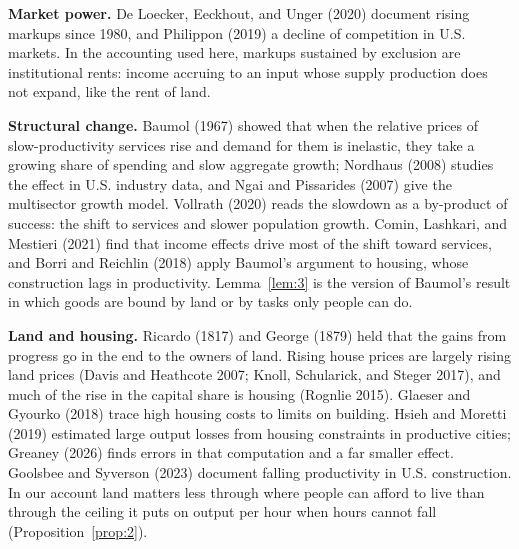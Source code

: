 \documentclass[12pt]{article}
\theoremstyle{plain}
\begin{document}
\textbf{Market power.} De Loecker, Eeckhout, and Unger (2020) document rising markups since 1980, and Philippon (2019) a decline of competition in U.S. markets. In the accounting used here, markups sustained by exclusion are institutional rents: income accruing to an input whose supply production does not expand, like the rent of land.

\textbf{Structural change.} Baumol (1967) showed that when the relative prices of slow-productivity services rise and demand for them is inelastic, they take a growing share of spending and slow aggregate growth; Nordhaus (2008) studies the effect in U.S. industry data, and Ngai and Pissarides (2007) give the multisector growth model. Vollrath (2020) reads the slowdown as a by-product of success: the shift to services and slower population growth. Comin, Lashkari, and Mestieri (2021) find that income effects drive most of the shift toward services, and Borri and Reichlin (2018) apply Baumol's argument to housing, whose construction lags in productivity. Lemma~\ref{lem:3} is the version of Baumol's result in which goods are bound by land or by tasks only people can do.

\textbf{Land and housing.} Ricardo (1817) and George (1879) held that the gains from progress go in the end to the owners of land. Rising house prices are largely rising land prices (Davis and Heathcote 2007; Knoll, Schularick, and Steger 2017), and much of the rise in the capital share is housing (Rognlie 2015). Glaeser and Gyourko (2018) trace high housing costs to limits on building. Hsieh and Moretti (2019) estimated large output losses from housing constraints in productive cities; Greaney (2026) finds errors in that computation and a far smaller effect. Goolsbee and Syverson (2023) document falling productivity in U.S. construction. In our account land matters less through where people can afford to live than through the ceiling it puts on output per hour when hours cannot fall (Proposition~\ref{prop:2}).
\end{document}
